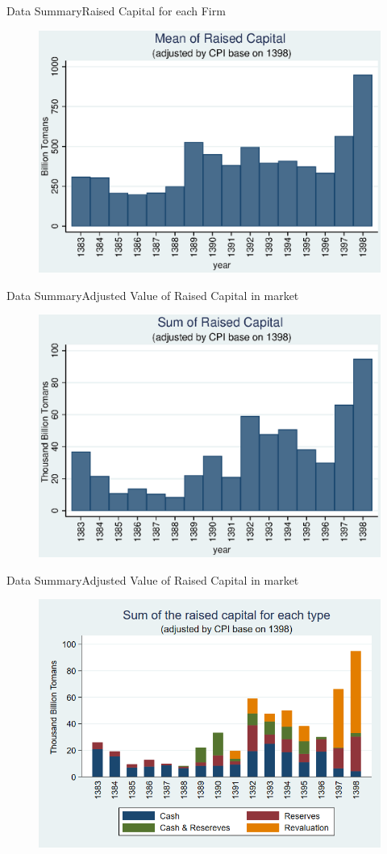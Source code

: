 \documentclass{beamer}
\begin{document}
\begin{frame}{Data Summary}{Raised Capital for each Firm}
\begin{figure}
\centering
\includegraphics[width=0.7\linewidth]{Output/MeanCapRaiseAdjusted.eps}
\label{fig:meancapraise}
\end{figure}
\end{frame}

\begin{frame}{Data Summary}{Adjusted Value of Raised Capital in market}
\begin{figure}
\centering
\includegraphics[width=0.7\linewidth]{Output/SumCapRaiseAdjusted.eps}
\label{fig:SumCapRaise}
\end{figure}
\end{frame}

\begin{frame}{Data Summary}{Adjusted Value of Raised Capital in market}
\begin{figure}
	\centering
	\includegraphics[width=0.7\linewidth]{Output/SumCapRaiseAdjustedEachtype}
	\label{fig:SumCapRaise2}
\end{figure}

\end{frame}
\end{document}
